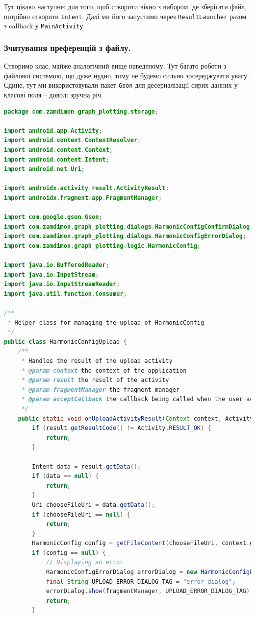 \documentclass[oneside,solution]{android-assign}
\begin{document}
Тут цікаво наступне: для того, щоб створити вікно з вибором, де зберігати файл, потрібно створити \texttt{Intent}. Далі ми його запустимо через \texttt{ResultLauncher} разом з callback у \texttt{MainActivity}.

\subsubsection{Зчитування преференцій з файлу.} Створимо клас, майже аналогічний вище наведеному. Тут багато роботи з файлової системою, що дуже нудно, тому не будемо сильно зосереджувати увагу. Єдине, тут ми використовували пакет \texttt{Gson} для десериалізації сирих данних у класові поля -- доволі зручна річ.

\begin{lstlisting}[language=java]
package com.zamdimon.graph_plotting.storage;

import android.app.Activity;
import android.content.ContentResolver;
import android.content.Context;
import android.content.Intent;
import android.net.Uri;

import androidx.activity.result.ActivityResult;
import androidx.fragment.app.FragmentManager;

import com.google.gson.Gson;
import com.zamdimon.graph_plotting.dialogs.HarmonicConfigConfirmDialog;
import com.zamdimon.graph_plotting.dialogs.HarmonicConfigErrorDialog;
import com.zamdimon.graph_plotting.logic.HarmonicConfig;

import java.io.BufferedReader;
import java.io.InputStream;
import java.io.InputStreamReader;
import java.util.function.Consumer;

/**
 * Helper class for managing the upload of HarmonicConfig
 */
public class HarmonicConfigUpload {
    /**
     * Handles the result of the upload activity
     * @param context the context of the application
     * @param result the result of the activity
     * @param fragmentManager the fragment manager
     * @param acceptCallback the callback being called when the user accepts the upload
     */
    public static void onUploadActivityResult(Context context, ActivityResult result, FragmentManager fragmentManager, Consumer<HarmonicConfig> acceptCallback) {
        if (result.getResultCode() != Activity.RESULT_OK) {
            return;
        }

        Intent data = result.getData();
        if (data == null) {
            return;
        }
        Uri chooseFileUri = data.getData();
        if (chooseFileUri == null) {
            return;
        }
        HarmonicConfig config = getFileContent(chooseFileUri, context.getContentResolver());
        if (config == null) {
            // Displaying an error
            HarmonicConfigErrorDialog errorDialog = new HarmonicConfigErrorDialog();
            final String UPLOAD_ERROR_DIALOG_TAG = "error_dialog";
            errorDialog.show(fragmentManager, UPLOAD_ERROR_DIALOG_TAG);
            return;
        }


\end{lstlisting}
\end{document}

